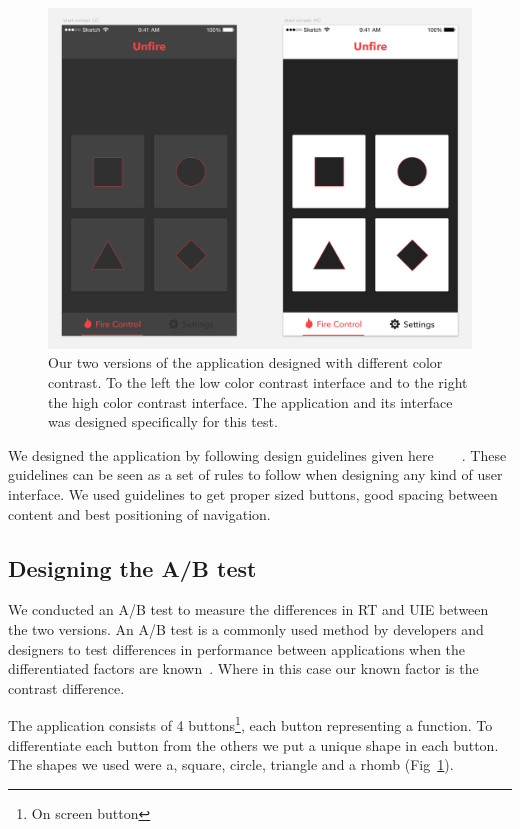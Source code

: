 \documentclass[runningheads,a4paper]{llncs}
\begin{document}
\begin{figure}
	\centering
	\includegraphics[width=\textwidth]{application}
	\caption{Our two versions of the application designed with different color contrast. To the left the low color contrast interface and to the right the high color contrast interface. The application and its interface was designed specifically for this test.
	\label{fig:application}}
\end{figure}

We designed the application by following design guidelines given here~\cite{hoober2011designing}~\cite{johnson2013designing}~\cite{gong2004guidelines}~\cite{norman2013design}. These guidelines can be seen as a set of rules to follow when designing any kind of user interface. We used guidelines to get proper sized buttons, good spacing between content and best positioning of navigation.

\subsection{Designing the A/B test}
We conducted an A/B test to measure the differences in RT and UIE between the two versions. An A/B test is a commonly used method by developers and designers to test differences in performance between applications when the differentiated factors are known~\cite{johnson2013designing}. Where in this case our known factor is the contrast difference. 

The application consists of 4 buttons\footnote{On screen button}, each button representing a function. To differentiate each button from the others we put a unique shape in each button. The shapes we used were a, square, circle, triangle and a rhomb (Fig~\ref{fig:application}).
\end{document}
